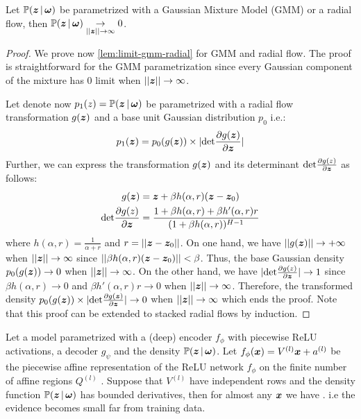\begin{lemma}
\label{lem:limit-gmm-radial}
Let $\mathbb{P}(\bm{z} \,|\, \bm{\omega})$ be parametrized with a Gaussian Mixture Model (GMM) or a radial flow, then $\mathbb{P}(\bm{z} \,|\, \bm{\omega})\underset{||\bm{z}|| \rightarrow \infty}{\rightarrow} 0$.
\end{lemma}
\begin{proof}
We prove now \cref{lem:limit-gmm-radial} for GMM and radial flow. The proof is straightforward for the GMM parametrization since every Gaussian component of the mixture has $0$ limit when $||\bm{z}|| \rightarrow \infty$.

Let denote now $p_1(z) = \mathbb{P}(\bm{z} \,|\, \bm{\omega})$ be parametrized with a radial flow transformation $g(\bm{z})$ and a base unit Gaussian distribution $p_0$ i.e.:
\begin{align*}
    p_1(\bm{z}) = p_0(g(\bm{z})) \times |\text{det}\frac{\partial g(\bm{z})}{\partial\bm{z}}|
\end{align*}
Further, we can express the transformation $g(\bm{z})$ and its determinant $\text{det}\frac{\partial g(z)}{\partial\bm{z}}$ as follows:
\begin{align*}
    g(\bm{z}) &= \bm{z} + \beta h(\alpha, r) (\bm{z} - \bm{z}_0)\\
    \text{det}\frac{\partial g(z)}{\partial\bm{z}} &= \frac{1+\beta h(\alpha, r)+\beta h'(\alpha, r)r}{(1 + \beta h(\alpha, r))^{H-1}}
\end{align*}
where $h(\alpha, r) =\frac{1}{\alpha + r}$ and $r=||\bm{z} - \bm{z}_0||$. On one hand, we have $||g(\bm{z})|| \rightarrow +\infty$ when $||\bm{z}|| \rightarrow \infty$ since $||\beta h(\alpha, r) (\bm{z} - \bm{z}_0)|| < \beta$. Thus, the base Gaussian density $p_0(g(\bm{z}))\rightarrow 0$ when $||\bm{z}|| \rightarrow \infty$. On the other hand, we have $|\text{det}\frac{\partial g(z)}{\partial\bm{z}}|\rightarrow 1$ since $\beta h(\alpha, r) \rightarrow 0$ and $\beta h'(\alpha, r)r \rightarrow 0$ when $||\bm{z}|| \rightarrow \infty$. Therefore, the transformed density $p_0(g(\bm{z})) \times |\text{det}\frac{\partial g(\bm{z})}{\partial\bm{z}}| \rightarrow 0$ when $||\bm{z}|| \rightarrow \infty$ which ends the proof. Note that this proof can be extended to stacked radial flows by induction.
\end{proof}

\begin{theorem*}
Let a \NatPNacro{} model parametrized with a (deep) encoder $f_{\phi}$ with piecewise ReLU activations, a decoder $g_{\psi}$ and the density $\mathbb{P}(\bm{z} \,|\, \bm{\omega})$. Let $f_{\phi}(\bm{x})= V^{(l)}\bm{x} + a^{(l)}$ be the piecewise affine representation of the ReLU network $f_{\phi}$ on the finite number of affine regions $Q^{(l)}$ \citep{understanding-nn-relu}. Suppose that $V^{(l)}$ have independent rows and the density function $\mathbb{P}(\bm{z} \,|\, \bm{\omega})$ has bounded derivatives, then for almost any $\bm{x}$ we have . i.e the evidence becomes small far from training data.
\end{theorem*}


